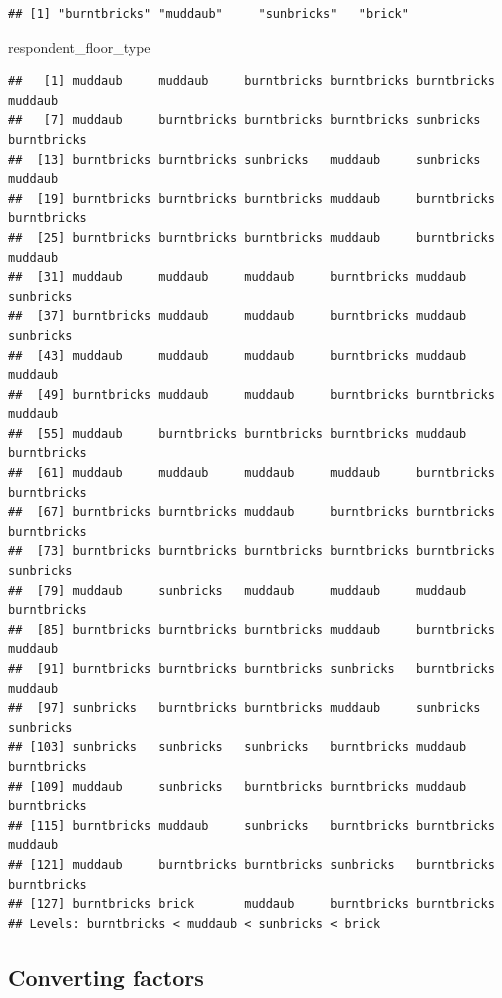 \documentclass[]{book}
\newenvironment{Shaded}{\begin{snugshade}}{\end{snugshade}}
\newcommand{\NormalTok}[1]{#1}
\begin{document}
\begin{verbatim}
## [1] "burntbricks" "muddaub"     "sunbricks"   "brick"
\end{verbatim}

\begin{Shaded}
\begin{Highlighting}[]
\NormalTok{respondent_floor_type}
\end{Highlighting}
\end{Shaded}

\begin{verbatim}
##   [1] muddaub     muddaub     burntbricks burntbricks burntbricks muddaub    
##   [7] muddaub     burntbricks burntbricks burntbricks sunbricks   burntbricks
##  [13] burntbricks burntbricks sunbricks   muddaub     sunbricks   muddaub    
##  [19] burntbricks burntbricks burntbricks muddaub     burntbricks burntbricks
##  [25] burntbricks burntbricks burntbricks muddaub     burntbricks muddaub    
##  [31] muddaub     muddaub     muddaub     burntbricks muddaub     sunbricks  
##  [37] burntbricks muddaub     muddaub     burntbricks muddaub     sunbricks  
##  [43] muddaub     muddaub     muddaub     burntbricks muddaub     muddaub    
##  [49] burntbricks muddaub     muddaub     burntbricks burntbricks muddaub    
##  [55] muddaub     burntbricks burntbricks burntbricks muddaub     burntbricks
##  [61] muddaub     muddaub     muddaub     muddaub     burntbricks burntbricks
##  [67] burntbricks burntbricks muddaub     burntbricks burntbricks burntbricks
##  [73] burntbricks burntbricks burntbricks burntbricks burntbricks sunbricks  
##  [79] muddaub     sunbricks   muddaub     muddaub     muddaub     burntbricks
##  [85] burntbricks burntbricks burntbricks muddaub     burntbricks muddaub    
##  [91] burntbricks burntbricks burntbricks sunbricks   burntbricks muddaub    
##  [97] sunbricks   burntbricks burntbricks muddaub     sunbricks   sunbricks  
## [103] sunbricks   sunbricks   sunbricks   burntbricks muddaub     burntbricks
## [109] muddaub     sunbricks   burntbricks burntbricks muddaub     burntbricks
## [115] burntbricks muddaub     sunbricks   burntbricks burntbricks muddaub    
## [121] muddaub     burntbricks burntbricks sunbricks   burntbricks burntbricks
## [127] burntbricks brick       muddaub     burntbricks burntbricks
## Levels: burntbricks < muddaub < sunbricks < brick
\end{verbatim}

\subsection{Converting factors}\label{converting-factors}
\end{document}
